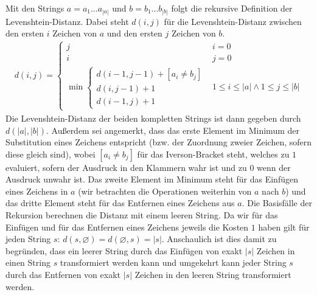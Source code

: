 \documentclass{whswinvcbook}
\begin{document}
Mit den Strings $a=a_1\dots a_{|a|}$ und $b=b_1\dots b_{|b|}$ folgt die rekursive Definition der Levenshtein-Distanz. Dabei steht $d(i,j)$ für die Levenshtein-Distanz zwischen den ersten $i$ Zeichen von $a$ und den ersten $j$ Zeichen von $b$.
\begin{align}
    d(i,j)=\begin{cases}
        j & i=0\\
        i & j=0\\
        \min\begin{cases}
            d(i-1,j-1)+[a_i\neq b_j]\\
            d(i,j-1)+1\\
            d(i-1,j)+1
        \end{cases} & 1\leq i\leq |a| \wedge 1\leq j\leq |b|
    \end{cases}
\end{align}
Die Levenshtein-Distanz der beiden kompletten Strings ist dann gegeben durch $d(|a|,|b|)$. Außerdem sei angemerkt, dass das erste Element im Minimum der Substitution eines Zeichens entspricht (bzw. der Zuordnung zweier Zeichen, sofern diese gleich sind), wobei $[a_i\neq b_j]$ für das Iverson-Bracket steht, welches zu $1$ evaluiert, sofern der Ausdruck in den Klammern wahr ist und zu $0$ wenn der Ausdruck unwahr ist. Das zweite Element im Minimum steht für das Einfügen eines Zeichens in $a$ (wir betrachten die Operationen weiterhin von $a$ nach $b$) und das dritte Element steht für das Entfernen eines Zeichens aus $a$. Die Basisfälle der Rekursion berechnen die Distanz mit einem leeren String. Da wir für das Einfügen und für das Entfernen eines Zeichens jeweils die Kosten $1$ haben gilt für jeden String $s$: $d(s,\varnothing)=d(\varnothing,s)=|s|$. Anschaulich ist dies damit zu begründen, dass ein leerer String durch das Einfügen von exakt $|s|$ Zeichen in einen String $s$ transformiert werden kann und umgekehrt kann jeder String $s$ durch das Entfernen von exakt $|s|$ Zeichen in den leeren String transformiert werden.
\end{document}
